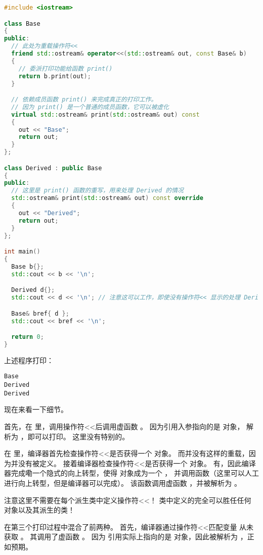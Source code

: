 \documentclass[../../LearnCpp.tex]{subfiles}
\begin{document}
\begin{lstlisting}[language=C++]
#include <iostream>

class Base
{
public:
  // 此处为重载操作符<<
  friend std::ostream& operator<<(std::ostream& out, const Base& b)
  {
    // 委派打印功能给函数 print()
    return b.print(out);
  }

  // 依赖成员函数 print() 来完成真正的打印工作。
  // 因为 print() 是一个普通的成员函数，它可以被虚化
  virtual std::ostream& print(std::ostream& out) const
  {
    out << "Base";
    return out;
  }
};

class Derived : public Base
{
public:
  // 这里是 print() 函数的重写，用来处理 Derived 的情况
  std::ostream& print(std::ostream& out) const override
  {
    out << "Derived";
    return out;
  }
};

int main()
{
  Base b{};
  std::cout << b << '\n';

  Derived d{};
  std::cout << d << '\n'; // 注意这可以工作，即使没有操作符<< 显示的处理 Derived 对象

  Base& bref{ d };
  std::cout << bref << '\n';

  return 0;
}
\end{lstlisting}

上述程序打印：

\begin{lstlisting}
Base
Derived
Derived
\end{lstlisting}

现在来看一下细节。

首先，在  里，调用操作符<<后调用虚函数 。
因为引用入参指向的是  对象， 解析为 ，即可以打印。
这里没有特别的。

在  里，编译器首先检查操作符<<是否获得一个  对象。
而并没有这样的重载，因为并没有被定义。
接着编译器检查操作符<<是否获得一个  对象。
有，因此编译器完成嘞一个隐式的向上转型，使得  对象成为一个 ，
并调用函数（这里可以人工进行向上转型，但是编译器可以完成）。
该函数调用虚函数 ，并被解析为 。

注意这里不需要在每个派生类中定义操作符<<！
 类中定义的完全可以胜任任何  对象以及其派生的类！

在第三个打印过程中混合了前两种。
首先，编译器通过操作符<<匹配变量  从未获取 。
其调用了虚函数 。
因为  引用实际上指向的是  对象，因此被解析为 ，正如预期。
\end{document}
